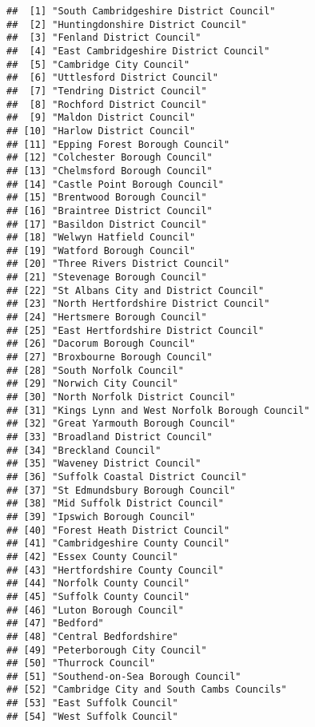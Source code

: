 \documentclass[
]{article}
\begin{document}
\begin{verbatim}
##  [1] "South Cambridgeshire District Council"      
##  [2] "Huntingdonshire District Council"           
##  [3] "Fenland District Council"                   
##  [4] "East Cambridgeshire District Council"       
##  [5] "Cambridge City Council"                     
##  [6] "Uttlesford District Council"                
##  [7] "Tendring District Council"                  
##  [8] "Rochford District Council"                  
##  [9] "Maldon District Council"                    
## [10] "Harlow District Council"                    
## [11] "Epping Forest Borough Council"              
## [12] "Colchester Borough Council"                 
## [13] "Chelmsford Borough Council"                 
## [14] "Castle Point Borough Council"               
## [15] "Brentwood Borough Council"                  
## [16] "Braintree District Council"                 
## [17] "Basildon District Council"                  
## [18] "Welwyn Hatfield Council"                    
## [19] "Watford Borough Council"                    
## [20] "Three Rivers District Council"              
## [21] "Stevenage Borough Council"                  
## [22] "St Albans City and District Council"        
## [23] "North Hertfordshire District Council"       
## [24] "Hertsmere Borough Council"                  
## [25] "East Hertfordshire District Council"        
## [26] "Dacorum Borough Council"                    
## [27] "Broxbourne Borough Council"                 
## [28] "South Norfolk Council"                      
## [29] "Norwich City Council"                       
## [30] "North Norfolk District Council"             
## [31] "Kings Lynn and West Norfolk Borough Council"
## [32] "Great Yarmouth Borough Council"             
## [33] "Broadland District Council"                 
## [34] "Breckland Council"                          
## [35] "Waveney District Council"                   
## [36] "Suffolk Coastal District Council"           
## [37] "St Edmundsbury Borough Council"             
## [38] "Mid Suffolk District Council"               
## [39] "Ipswich Borough Council"                    
## [40] "Forest Heath District Council"              
## [41] "Cambridgeshire County Council"              
## [42] "Essex County Council"                       
## [43] "Hertfordshire County Council"               
## [44] "Norfolk County Council"                     
## [45] "Suffolk County Council"                     
## [46] "Luton Borough Council"                      
## [47] "Bedford"                                    
## [48] "Central Bedfordshire"                       
## [49] "Peterborough City Council"                  
## [50] "Thurrock Council"                           
## [51] "Southend-on-Sea Borough Council"            
## [52] "Cambridge City and South Cambs Councils"    
## [53] "East Suffolk Council"                       
## [54] "West Suffolk Council"
\end{verbatim}
\end{document}
